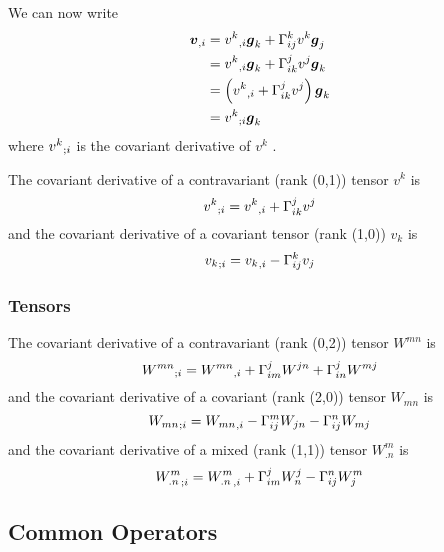 We can now write
\begin{equation}
  \begin{split}
    \partialderiv{\vect{v}}{i}&=\partialderiv{v^{k}}{i}\vect{g}_{k}+\christoffel{k}{i}{j}v^{k}\vect{g}_{j}\\
    &=\partialderiv{v^{k}}{i}\vect{g}_{k}+\christoffel{j}{i}{k}v^{j}\vect{g}_{k}\\
    &=\pbrac{\partialderiv{v^{k}}{i}+\christoffel{j}{i}{k}v^{j}}\vect{g}_{k}\\
    &=\covarderiv{v^{k}}{i}\vect{g}_{k}
  \end{split}
\end{equation}
where $ {v^{k}}_{;i} $ is the covariant derivative of $v^{k}$ . 

The covariant derivative of a contravariant (rank (0,1)) tensor $v^{k}$ is
\begin{equation}
   {v^{k}}_{;i}  = {v^{k}}_{,i} + \Gamma^{j}_{ik} v^{j}
\end{equation}
and the covariant derivative of a covariant tensor  (rank (1,0)) $v_{k}$ is
\begin{equation}
   {v_{k}}_{;i}  = {v_{k}}_{,i} - \Gamma^{k}_{ij} v_{j}
\end{equation}

\subsubsection{Tensors}

The covariant derivative of a contravariant (rank (0,2)) tensor $W^{mn}$ is
\begin{equation}
   {W^{mn}}_{;i} = {W^{mn}}_{,i} + \Gamma^{j}_{im} W^{jn}+ \Gamma^{j}_{in} W^{mj}
\end{equation}
and the covariant derivative of a covariant (rank (2,0)) tensor $W_{mn}$ is
\begin{equation}
   {W_{mn}}_{;i} = {W_{mn}}_{,i} - \Gamma^{m}_{ij} W_{jn}- \Gamma^{n}_{ij} W_{mj}
\end{equation}
and the covariant derivative of a mixed (rank (1,1)) tensor $W^{m}_{.n}$ is
\begin{equation}
   {W^{m}_{.n}}_{;i} = {W^{m}_{.n}}_{,i} + \Gamma^{j}_{im} W^{j}_{n}- \Gamma^{n}_{ij} W^{m}_{j}
\end{equation}

\subsection{Common Operators}

